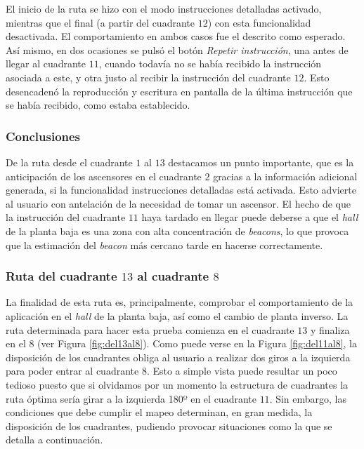 El inicio de la ruta se hizo con el modo instrucciones detalladas activado, mientras que el final (a partir del cuadrante $12$) con esta funcionalidad desactivada. El comportamiento en ambos casos fue el descrito como esperado. Así mismo, en dos ocasiones se pulsó el botón \textit{Repetir instrucción}, una antes de llegar al cuadrante $11$, cuando todavía no se había recibido la instrucción asociada a este, y otra justo al recibir la instrucción del cuadrante $12$. Esto desencadenó la reproducción y escritura en pantalla de la última instrucción que se había recibido, como estaba establecido. 

\subsubsection*{Conclusiones}


De la ruta desde el cuadrante $1$ al $13$ destacamos un punto importante, que es la anticipación de los ascensores en el cuadrante $2$ gracias a la información adicional generada, si la funcionalidad instrucciones detalladas está activada. Esto advierte al usuario con antelación de la necesidad de tomar un ascensor. El hecho de que la instrucción del cuadrante $11$ haya tardado en llegar puede deberse a que el \textit{hall} de la planta baja es una zona con alta concentración de \textit{beacons}, lo que provoca que la estimación del \textit{beacon} más cercano tarde en hacerse correctamente. 

\subsubsection{Ruta del cuadrante $13$ al cuadrante $8$}
\label{subsub:13al8}

La finalidad de esta ruta es, principalmente, comprobar el comportamiento de la aplicación en el \textit{hall} de la planta baja, así como el cambio de planta inverso. La ruta determinada para hacer esta prueba comienza en el cuadrante $13$ y finaliza en el $8$ (ver Figura \ref{fig:del13al8}). Como puede verse en la Figura \ref{fig:del11al8}, la disposición de los cuadrantes obliga al usuario a realizar dos giros a la izquierda para poder entrar al cuadrante $8$. Esto a simple vista puede resultar un poco tedioso puesto que si olvidamos por un momento la estructura de cuadrantes la ruta óptima sería girar a la izquierda 180º en el cuadrante $11$. Sin embargo, las condiciones que debe cumplir el mapeo determinan, en gran medida, la disposición de los cuadrantes, pudiendo provocar situaciones como la que se detalla a continuación.

